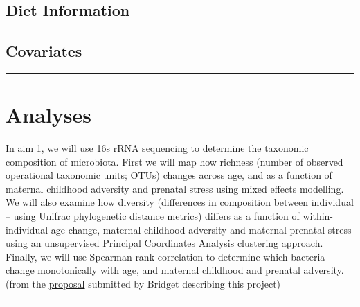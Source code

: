 \documentclass[
]{book}
\begin{document}
\hypertarget{diet-information}{%
\subsection{Diet Information}\label{diet-information}}

\hypertarget{covariates}{%
\subsection{Covariates}\label{covariates}}

\begin{center}\rule{0.5\linewidth}{0.5pt}\end{center}

\hypertarget{analyses}{%
\section{Analyses}\label{analyses}}

In aim 1, we will use 16s rRNA sequencing to determine the taxonomic composition of microbiota. First we will map how richness (number of observed operational taxonomic units; OTUs) changes across age, and as a function of maternal childhood adversity and prenatal stress using mixed effects modelling. We will also examine how diversity (differences in composition between individual -- using Unifrac phylogenetic distance metrics) differs as a function of within-individual age change, maternal childhood adversity and maternal prenatal stress using an unsupervised Principal Coordinates Analysis clustering approach. Finally, we will use Spearman rank correlation to determine which bacteria change monotonically with age, and maternal childhood and prenatal adversity. (from the \href{https://ucla.app.box.com/file/740587024475}{proposal} submitted by Bridget describing this project)

\begin{center}\rule{0.5\linewidth}{0.5pt}\end{center}

  
\end{document}
